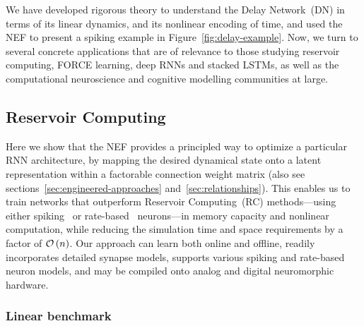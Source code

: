 We have developed rigorous theory to understand the Delay Network~(DN) in terms of its linear dynamics, and its nonlinear encoding of time, and used the NEF to present a spiking example in Figure~\ref{fig:delay-example}.
Now, we turn to several concrete applications that are of relevance to those studying reservoir computing, FORCE learning, deep RNNs and stacked LSTMs, as well as the computational neuroscience and cognitive modelling communities at large.

\subsection{Reservoir Computing}
\label{sec:delay-rc}

Here we show that the NEF provides a principled way to optimize a particular RNN architecture, by mapping the desired dynamical state onto a latent representation within a factorable connection weight matrix (also see sections~\ref{sec:engineered-approaches} and~\ref{sec:relationships}).
This enables us to train networks that outperform Reservoir Computing~(RC) methods---using either spiking~\citep[LSM;][]{maass2002real} or rate-based~\citep[ESN;][]{jaeger2001echo} neurons---in memory capacity and nonlinear computation, while reducing the simulation time and space requirements by a factor of $\mathcal{O}\left({n}\right)$.
Our approach can learn both online and offline, readily incorporates detailed synapse models, supports various spiking and rate-based neuron models, and may be compiled onto analog and digital neuromorphic hardware.

\subsubsection{Linear benchmark}

